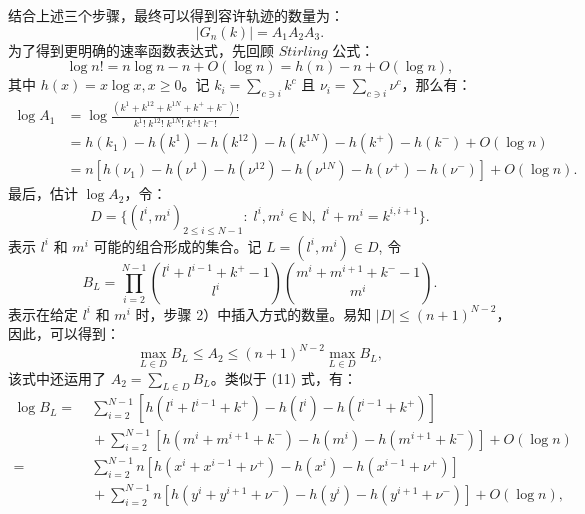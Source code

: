 结合上述三个步骤，最终可以得到容许轨迹的数量为：
\begin{equation}\label{trajectories}
    |G_n(k)|=A_1A_2A_3.
\end{equation}
为了得到更明确的速率函数表达式，先回顾 $Stirling$ 公式：
\begin{equation*}
    \log n! = n\log n-n+O(\log n)=h(n)-n+O(\log n),
\end{equation*}
其中 $h(x)=x \log x, x \geqslant 0$。记 $k_i=\sum_{c\ni i}k^c$ 且 $\nu_i=\sum_{c\ni i}\nu^c$，那么有：
\begin{equation}\label{log A1}
    \begin{split}
    \log A_1&=\log\frac{(k^1+k^{12}+k^{1N}+k^{+}+k^{-})!}{k^1!\;k^{12}!\;k^{1N}!\;k^{+}!\;k^{-}!}\\
    &= h(k_1)-h(k^1)-h(k^{12})-h(k^{1N})-h(k^+)-h(k^-)+O(\log n)\\
    &= n\left[h(\nu_1)-h(\nu^1)-h(\nu^{12})-h(\nu^{1N})-h(\nu^+)-h(\nu^-)\right]+O(\log n).
    \end{split}
\end{equation}
最后，估计 $\log A_2$，令：
\begin{equation*}
    D = \{(l^i,m^i)_{2\le i\le N-1}:\;l^i,m^i\in\mathbb{N},\;l^i+m^i=k^{i,i+1}\}.
\end{equation*}
表示 $l^i$ 和 $m^i$ 可能的组合形成的集合。记 $L = (l^i,m^i)\in D$, 令
\begin{equation*}
B_L=\prod_{i=2}^{N-1}\binom{l^{i}+l^{i-1}+k^{+}-1}{l^{i}}\binom{m^{i}+m^{i+1}+k^{-}-1}{m^{i}}.
\end{equation*}
表示在给定 $l^i$ 和 $m^i$ 时，步骤 2）中插入方式的数量。易知 $|D| \leqslant (n+1)^{N-2}$，因此，可以得到：
\begin{equation}\label{inequality}
    \max_{L\in D}B_L \le A_2 \le (n+1)^{N-2} \max_{L\in D}B_L,
\end{equation}
该式中还运用了 $A_2 = \sum_{L\in D}B_L$。类似于 (11) 式，有：
\begin{equation}\label{log BL}
    \begin{split}
    \log B_L =&\;\sum_{i=2}^{N-1}[h(l^i+l^{i-1}+k^+)-h(l^i)-h(l^{i-1}+k^+)]\\
    &\;+\sum_{i=2}^{N-1}[h(m^i+m^{i+1}+k^-)-h(m^i)-h(m^{i+1}+k^-)]+O(\log n)\\
    =&\;\sum_{i=2}^{N-1}n[h(x^i+x^{i-1}+\nu^+)-h(x^i)-h(x^{i-1}+\nu^+)]\\
    &\;+\sum_{i=2}^{N-1}n[h(y^i+y^{i+1}+\nu^-)-h(y^i)-h(y^{i+1}+\nu^-)]+O(\log n),
    \end{split}
\end{equation}
